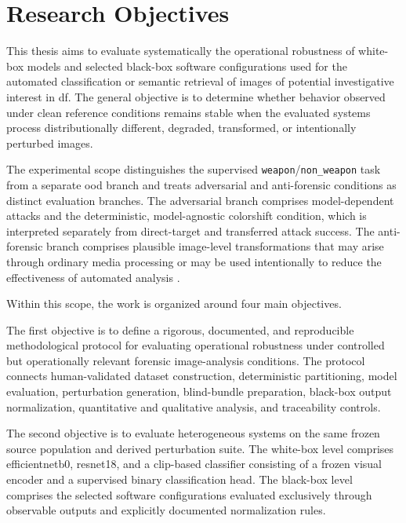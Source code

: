 \section{Research Objectives}

This thesis aims to evaluate systematically the operational robustness of
white-box models and selected black-box software configurations used for
the automated classification or semantic retrieval of images of potential
investigative interest in \gls{df}. The general objective is to determine
whether behavior observed under clean reference conditions remains stable when
the evaluated systems process distributionally different, degraded,
transformed, or intentionally perturbed images.

The experimental scope distinguishes the supervised
\texttt{weapon}/\texttt{non\_weapon} task from a separate \gls{ood} branch and
treats adversarial and anti-forensic conditions as distinct evaluation branches.
The adversarial branch comprises model-dependent attacks and the deterministic,
model-agnostic \gls{colorshift} condition, which is interpreted separately from
direct-target and transferred attack success. The anti-forensic branch comprises
plausible image-level transformations that may arise through ordinary media
processing or may be used intentionally to reduce the effectiveness of
automated analysis
\cite{hendrycks2017baseline,hendrycks2019benchmarking}.

Within this scope, the work is organized around four main objectives.

The first objective is to define a rigorous, documented, and reproducible
methodological protocol for evaluating operational robustness under controlled
but operationally relevant forensic image-analysis conditions. The protocol
connects human-validated dataset construction, deterministic partitioning,
model evaluation, perturbation generation, blind-bundle preparation,
black-box output normalization, quantitative and qualitative analysis, and
traceability controls.

The second objective is to evaluate heterogeneous systems on the same frozen
source population and derived perturbation suite. The white-box level
comprises \gls{efficientnetb0}, \gls{resnet18}, and a \gls{clip}-based classifier consisting of
a frozen visual encoder and a supervised binary classification head. The
black-box level comprises the selected software configurations evaluated
exclusively through observable outputs and explicitly documented normalization
rules.

